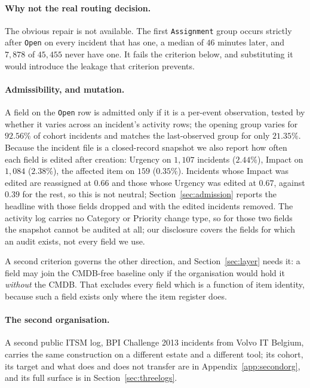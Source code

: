\documentclass[preprint,12pt]{elsarticle}
\begin{document}
\paragraph{Why not the real routing decision.}
The obvious repair is not available. The first \texttt{Assignment} group
occurs strictly after \texttt{Open} on every incident that has one, a median
of $46$ minutes later, and $7{,}878$ of $45{,}455$ never have one. It fails
the criterion below, and substituting it would introduce the leakage that
criterion prevents.

\paragraph{Admissibility, and mutation.}
A field on the \texttt{Open} row is admitted only if it is a per-event
observation, tested by whether it varies across an incident's activity rows;
the opening group varies for $92.56\%$ of cohort incidents and matches the
last-observed group for only $21.35\%$. Because the incident file is a
closed-record snapshot we also report how often each field is edited after
creation: Urgency on $1{,}107$ incidents ($2.44\%$), Impact on $1{,}084$
($2.38\%$), the affected item on $159$ ($0.35\%$). Incidents whose Impact was edited are
reassigned at $0.66$ and those whose Urgency was edited at $0.67$, against
$0.39$ for the rest, so this is not neutral; Section~\ref{sec:admission} reports the headline with
those fields dropped and with the edited incidents removed. The activity log
carries no Category or Priority change type, so for those two fields the
snapshot cannot be audited at all; our disclosure covers the fields for which
an audit exists, not every field we use.

A second criterion governs the other direction, and Section~\ref{sec:layer}
needs it: a field may join the CMDB-free baseline only if the organisation
would hold it \emph{without} the CMDB. That excludes every field which is a
function of item identity, because such a field exists only where the item
register does.

\paragraph{The second organisation.}
A second public ITSM log, BPI Challenge 2013 incidents from Volvo IT Belgium, carries the same construction on a different estate and a different tool; its cohort, its target and what does and does not transfer are in Appendix~\ref{app:secondorg}, and its full surface is in Section~\ref{sec:threelogs}.
\end{document}
